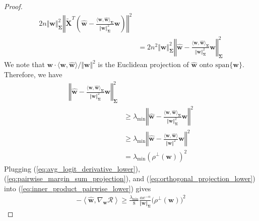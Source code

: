 \documentclass[pdflatex,sn-basic]{sn-jnl}%
\theoremstyle{thmstyleone}%
\begin{document}
\begin{appendices}
\begin{proof}
\begin{equation}
\begin{aligned}
    2 n \Vert \mathbf{w} \Vert_{\mathbf{\Sigma}}^2 
    \left\Vert
    \tilde{\mathbf{X}}^T
      \left(
        \hat{\mathbf{w}} - \frac{\langle \mathbf{w},  \hat{\mathbf{w}} \rangle_{\mathbf{\Sigma}} }{ \Vert \mathbf{w} \Vert_{\mathbf{\Sigma}}^{2}} \mathbf{w}
      \right)
    \right\Vert^2
    \\ & = 
    2 n^2 \Vert \mathbf{w} \Vert_{\mathbf{\Sigma}}^2 
    \left\Vert
      \hat{\mathbf{w}} - \frac{\langle \mathbf{w},  \hat{\mathbf{w}} \rangle_{\mathbf{\Sigma}} }{ \Vert \mathbf{w} \Vert_{\mathbf{\Sigma}}^{2}} \mathbf{w}
    \right\Vert_{\mathbf{\Sigma}}^2
  \end{aligned}
  \end{equation}
  We note that
  $\mathbf{w} \cdot \langle \mathbf{w}, \hat{\mathbf{w}}\rangle / \Vert \mathbf{w} \Vert^2$
  is the Euclidean projection of $\hat{\mathbf{w}}$ onto $\text{span}\{\mathbf{w}\}$.
  Therefore,
  we have 
  \begin{equation}\label{eq:orthogonal_projection_lower}
  \begin{aligned}
    \left\Vert
      \hat{\mathbf{w}}
      -
      \frac{\langle \mathbf{w},  \hat{\mathbf{w}} \rangle_{\mathbf{\Sigma}} }{ \Vert \mathbf{w} \Vert_{\mathbf{\Sigma}}^{2}} \mathbf{w}
    \right\Vert_{\mathbf{\Sigma}}^2
    \\ & \ge 
    \lambda_{\min}
    \left\Vert
      \hat{\mathbf{w}}
      -
      \frac{\langle \mathbf{w},  \hat{\mathbf{w}} \rangle_{\mathbf{\Sigma}} }{ \Vert \mathbf{w} \Vert_{\mathbf{\Sigma}}^{2}} \mathbf{w}
    \right\Vert^2
    \\ & \ge 
    \lambda_{\min}
    \left\Vert
      \hat{\mathbf{w}}
      -
      \frac{\langle \mathbf{w},  \hat{\mathbf{w}} \rangle }{ \Vert \mathbf{w} \Vert^{2}} \mathbf{w}
    \right\Vert^2
    \\ & =
    \lambda_{\min}
    \left( {\rho}^{\perp} \left(\mathbf{w}\right)\right)^2
  \end{aligned}
  \end{equation}
  Plugging (\ref{eq:avg_logit_derivative_lower}), (\ref{eq:pairwise_margin_sum_projection}), and (\ref{eq:orthogonal_projection_lower}) into (\ref{eq:inner_product_pairwise_lower}) gives
  \begin{equation*}
  \begin{aligned}
    - \left\langle \hat{\mathbf{w}}, \nabla_{\mathbf{w}} \mathcal{R} \right\rangle 
    \ge 
    \frac{ \lambda_{\min}}{8} 
    \frac{\alpha e^{-\alpha}}{ \Vert \mathbf{w} \Vert_{\mathbf{\Sigma}}}
    \big( {\rho}^{\perp} \left(\mathbf{w}\right)\big)^2
  \end{aligned}
  \end{equation*}
\end{proof}


\end{appendices}
\end{document}
